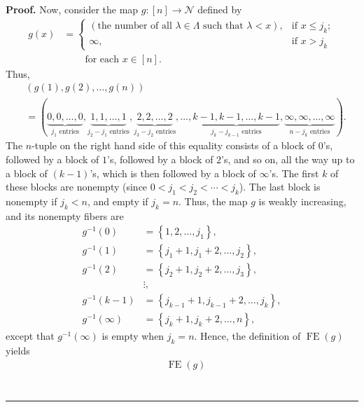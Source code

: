 \documentclass[numbers=enddot,12pt,final,onecolumn,notitlepage]{scrartcl}%
\theoremstyle{definition}
\newenvironment{proof}[1][Proof]{\noindent\textbf{#1.} }{\ \rule{0.5em}{0.5em}}
\newenvironment{vershort}{}{}
\begin{document}
\begin{vershort}
\begin{proof}
Now, consider the map $g:\left[  n\right]  \rightarrow\mathcal{N}$ defined by%
\begin{align*}
g\left(  x\right)   &  =%
\begin{cases}
\left(  \text{the number of all }\lambda\in\Lambda\text{ such that }%
\lambda<x\right)  , & \text{if }x\leq j_{k};\\
\infty, & \text{if }x>j_{k}%
\end{cases}
\\
&  \ \ \ \ \ \ \ \ \ \ \text{for each }x\in\left[  n\right]  .
\end{align*}
Thus,%
\begin{align*}
&  \left(  g\left(  1\right)  ,g\left(  2\right)  ,\ldots,g\left(  n\right)
\right)  \\
&  =\left(  \underbrace{0,0,\ldots,0}_{j_{1}\text{ entries}}%
,\underbrace{1,1,\ldots,1}_{j_{2}-j_{1}\text{ entries}},\underbrace{2,2,\ldots
,2}_{j_{3}-j_{2}\text{ entries}},\ldots,\underbrace{k-1,k-1,\ldots,k-1}%
_{j_{k}-j_{k-1}\text{ entries}},\underbrace{\infty,\infty,\ldots,\infty
}_{n-j_{k}\text{ entries}}\right)  .
\end{align*}
The $n$-tuple on the right hand side of this equality consists of a block of
$0$'s, followed by a block of $1$'s, followed by a block of $2$'s, and so on,
all the way up to a block of $\left(  k-1\right)  $'s, which is then followed
by a block of $\infty$'s. The first $k$ of these blocks are nonempty (since
$0<j_{1}<j_{2}<\cdots<j_{k}$). The last block is nonempty if $j_{k}<n$, and
empty if $j_{k}=n$. Thus, the map $g$ is weakly increasing, and its nonempty
fibers are
\begin{align*}
g^{-1}\left(  0\right)   &  =\left\{  1,2,\ldots,j_{1}\right\}  ,\\
g^{-1}\left(  1\right)   &  =\left\{  j_{1}+1,j_{1}+2,\ldots,j_{2}\right\}
,\\
g^{-1}\left(  2\right)   &  =\left\{  j_{2}+1,j_{2}+2,\ldots,j_{3}\right\}
,\\
&  \vdots,\\
g^{-1}\left(  k-1\right)   &  =\left\{  j_{k-1}+1,j_{k-1}+2,\ldots
,j_{k}\right\}  ,\\
g^{-1}\left(  \infty\right)   &  =\left\{  j_{k}+1,j_{k}+2,\ldots,n\right\}  ,
\end{align*}
except that $g^{-1}\left(  \infty\right)  $ is empty when $j_{k}=n$. Hence,
the definition of $\operatorname*{FE}\left(  g\right)  $ yields%
\begin{align*}
&  \operatorname*{FE}\left(  g\right)  \\

\end{align*}
\end{proof}
\end{vershort}
\end{document}
